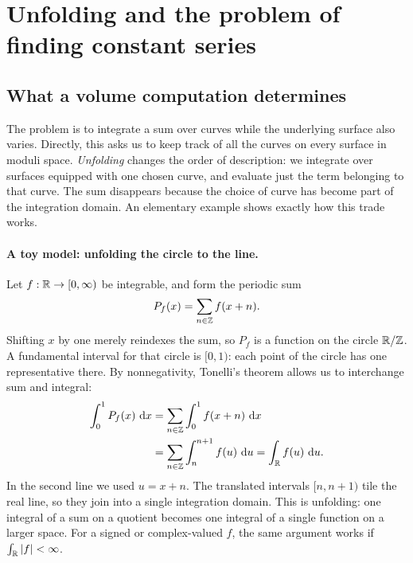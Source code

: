 \section{Unfolding and the problem of finding constant series}
\label{sec:unfolding}

\subsection{What a volume computation determines}

The problem is to integrate a sum over curves while the underlying
surface also varies. Directly, this asks us to keep track of all the
curves on every surface in moduli space. \emph{Unfolding} changes the
order of description: we integrate over surfaces equipped with one
chosen curve, and evaluate just the term belonging to that curve.
The sum disappears because the choice of curve has become part of
the integration domain. An elementary example shows exactly how
this trade works.

\paragraph{A toy model: unfolding the circle to the line.}
Let $f:\mathbb R\to[0,\infty)$ be integrable, and form the periodic sum
\[
 P_f(x)=\sum_{n\in\mathbb Z}f(x+n).
\]
Shifting $x$ by one merely reindexes the sum, so $P_f$ is a
function on the circle $\mathbb R/\mathbb Z$. A fundamental interval for
that circle is $[0,1)$: each point of the circle has one
representative there. By nonnegativity, Tonelli's theorem allows
us to interchange sum and integral:
\[
 \begin{aligned}
 \int_0^1P_f(x)\,\mathop{}\!\mathrm d x
 &=\sum_{n\in\mathbb Z}\int_0^1f(x+n)\,\mathop{}\!\mathrm d x\\
 &=\sum_{n\in\mathbb Z}\int_n^{n+1}f(u)\,\mathop{}\!\mathrm d u
 =\int_{\mathbb R}f(u)\,\mathop{}\!\mathrm d u.
 \end{aligned}
\]
In the second line we used $u=x+n$. The translated intervals
$[n,n+1)$ tile the real line, so they join into a single
integration domain. This is unfolding: one integral of a
sum on a quotient becomes one integral of a single function on
a larger space. For a signed or complex-valued $f$, the same
argument works if $\int_{\mathbb R}|f|<\infty$.

